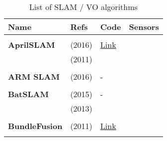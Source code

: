 \documentclass[a4paper,12pt]{scrartcl}
\begin{document}
{\footnotesize
\begin{longtable}{l|l|l|l}
  \caption{List of SLAM / VO algorithms}\\[2mm]
  \label{tab:list_found_slam_algorithms}
  \textbf{Name}            & \textbf{Refs}                     & \textbf{Code}                                                      & \textbf{Sensors} \\
    \hline
                           &                                   &                                                                    &                       \\
    \textbf{AprilSLAM}     & \cite{Wang2016} (2016)            & \href{https://github.com/ProjectArtemis/aprilslam}{Link}           &                       \\
                           & \cite{Olson2011} (2011)           &                                                                    &                       \\
                           &                                   &                                                                    &                       \\
    \textbf{ARM SLAM}      & \cite{Klingensmith2016} (2016)    & -                                                                  &                       \\
                           &                                   &                                                                    &                       \\
    \textbf{BatSLAM}       & \cite{Steckel2015} (2015)         & -                                                                  &                       \\
                           & \cite{Steckel2013} (2013)         &                                                                    &                       \\
                           &                                   &                                                                    &                       \\
    \textbf{BundleFusion}  & \cite{Dai2017} (2011)             & {\href{https://github.com/niessner/BundleFusion}{Link}}            &                       \\
                           &                                   &                                                                    &                       \\

\end{longtable}}
\end{document}
